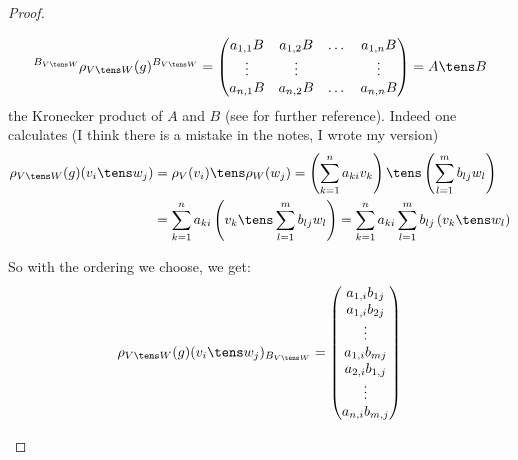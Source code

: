 \documentclass[twoside = false,	%
		headsepline,		%
		parskip = true,
		]{scrbook}						%
\begin{document}
\begin{proof}
\begin{enumerate}
                    \begin{equation*}
                        \tensor[^{B_{V \tens W}}]{\rho_{V \tens W}(g)}{^{B_{V \tens W}}} = \begin{pmatrix}
                            a_{1,1}B & a_{1,2}B & \dots & a_{1,n}B \\
                            \vdots & \vdots & & \vdots \\
                            a_{n,1}B & a_{n,2}B & \dots & a_{n,n}B
                        \end{pmatrix} = A \tens B
                    \end{equation*}
                    the Kronecker product of $A$ and $B$ (see \cite{LA} for further reference).
                    Indeed one calculates (I think there is a mistake in the notes, I wrote my version)
                    \begin{equation*}
                    \begin{split}
                        \rho_{V \tens W}(g)(v_i \tens w_j) &= \rho_V(v_i) \tens \rho_W(w_j) = \round{\sum_{k=1}^n a_{ki}v_k }\tens \round{\sum_{l=1}^m b_{lj}w_l } \\
                        &= \sum_{k=1}^n a_{ki} \round{v_k \tens \sum_{l=1}^m b_{lj} w_l} = \sum_{k=1}^n a_{ki} \sum_{l=1}^m b_{lj} \round{v_k \tens w_l } 
                    \end{split}
                    \end{equation*}
    
                    So with the ordering we choose, we get:
                    \begin{equation*}
                        \rho_{V \tens W}(g)(v_i \tens w_j)_{B_{V \tens W}} =
                        \begin{pmatrix}
                            a_{1,i} b_{1j} \\
                            a_{1,i} b_{2j} \\
                            \vdots \\
                            a_{1,i} b_{mj} \\
                            a_{2,i} b_{1,j} \\
                            \vdots \\
                            a_{n,i} b_{m,j}
                        \end{pmatrix}
                    \end{equation*}
    

\end{enumerate}
\end{proof}
\end{document}
